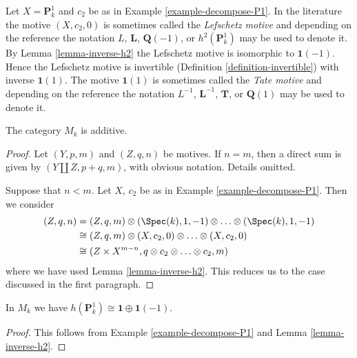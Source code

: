 \begin{remark}
\label{remark-lefschetz-tate}
Let $X = \mathbf{P}^1_k$ and $c_2$ be as in Example \ref{example-decompose-P1}.
In the literature the motive $(X, c_2, 0)$ is sometimes called the
{\it Lefschetz motive} and depending on the reference the notation
$L$, $\mathbf{L}$, $\mathbf{Q}(-1)$, or $h^2(\mathbf{P}^1_k)$
may be used to denote it. By Lemma \ref{lemma-inverse-h2} the Lefschetz motive
is isomorphic to $\mathbf{1}(-1)$. Hence the Lefschetz motive is
invertible (Definition \ref{definition-invertible}) with inverse
$\mathbf{1}(1)$. The motive $\mathbf{1}(1)$ is sometimes called the
{\it Tate motive} and depending on the reference the notation
$L^{-1}$, $\mathbf{L}^{-1}$, $\mathbf{T}$, or $\mathbf{Q}(1)$ may
be used to denote it.
\end{remark}

\begin{lemma}
\label{lemma-additive}
The category $M_k$ is additive.
\end{lemma}

\begin{proof}
Let $(Y, p, m)$ and $(Z, q, n)$ be motives. If $n = m$, then a
direct sum is given by $(Y \amalg Z, p + q, m)$, with obvious notation.
Details omitted.

\medskip\noindent
Suppose that $n < m$. Let $X$, $c_2$ be as in
Example \ref{example-decompose-P1}. Then we consider
\begin{align*}
(Z, q, n)
& =
(Z, q, m) \otimes (\Spec(k), 1, -1) \otimes \ldots \otimes
(\Spec(k), 1, -1) \\
& \cong
(Z, q, m) \otimes (X, c_2, 0) \otimes \ldots \otimes (X, c_2, 0) \\
& \cong
(Z \times X^{m - n}, q \otimes c_2 \otimes \ldots \otimes c_2, m)
\end{align*}
where we have used Lemma \ref{lemma-inverse-h2}.
This reduces us to the case discussed in the first paragraph.
\end{proof}

\begin{lemma}
\label{lemma-decompose-P1}
In $M_k$ we have $h(\mathbf{P}^1_k) \cong \mathbf{1} \oplus \mathbf{1}(-1)$.
\end{lemma}

\begin{proof}
This follows from Example \ref{example-decompose-P1} and
Lemma \ref{lemma-inverse-h2}.
\end{proof}

